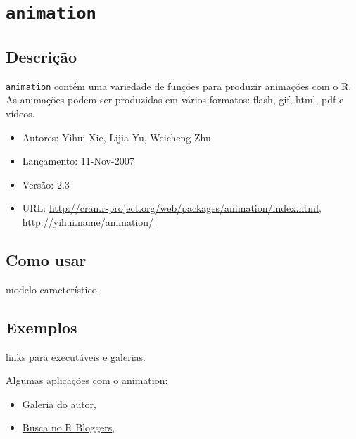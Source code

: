 \section{\texttt{animation}}


\subsection{Descrição}

\begin{frame}

  \texttt{animation} contém uma variedade de funções para produzir
  animações com o R. As animações podem ser produzidas em vários
  formatos: flash, gif, html, pdf e vídeos.

  \begin{itemize}
    \itemsep1pt\parskip0pt
  \item Autores: Yihui Xie, Lijia Yu, Weicheng Zhu
  \item Lançamento: 11-Nov-2007
  \item Versão: 2.3
  \item URL:
    \url{http://cran.r-project.org/web/packages/animation/index.html},
    \url{http://yihui.name/animation/}
  \end{itemize}

\end{frame}


\subsection{Como usar}

\begin{frame}

  modelo característico.

\end{frame}


\subsection{Exemplos}

\begin{frame}

  links para executáveis e galerias.

  Algumas aplicações com o animation:
  \begin{itemize}
    \itemsep1pt\parskip0pt
  \item
    \href{http://vis.supstat.com/categories.html\#animation-ref}{Galeria
      do autor},
  \item \href{http://www.r-bloggers.com/?s=animation}{Busca no R
      Bloggers},
  \end{itemize}

\end{frame}
